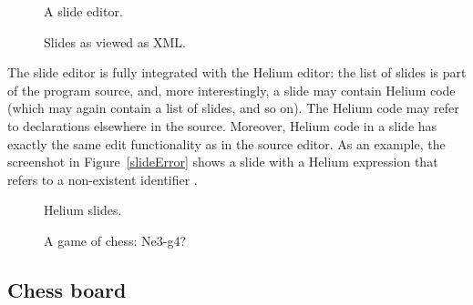 \begin{figure}
  \begin{minipage}[t]{.40\textwidth}
    \begin{center}   
      \caption{A slide editor.} \label{slideEditorWYSIWYG}
    \end{center}
  \end{minipage}
\hfill
  \begin{minipage}[t]{.57\textwidth}
    \begin{center}  
      \caption{Slides as viewed as XML.} \label{slideEditorSource}
    \end{center}
  \end{minipage}
\end{figure}


The slide editor is fully integrated with the Helium editor: the list of slides is part of the program source, and, more interestingly, a slide may contain Helium code (which may again contain a list of slides, and so on). The Helium code may refer to declarations elsewhere in the source. Moreover, Helium code in a slide has exactly the same edit functionality as in the source editor. As an example, the screenshot in Figure~\ref{slideError} shows a slide with  a Helium expression that refers to a non-existent identifier .

\begin{figure}
\begin{minipage}[t]{.47\textwidth}
    \begin{center}   
      \caption{Helium slides.} \label{slideError}
    \end{center}
  \end{minipage}
\hfill
\begin{minipage}[t]{.47\textwidth}
    \begin{center}  
      \caption{A game of chess: Ne3-g4?}\label{chessBoard} 
    \end{center}
  \end{minipage}
\end{figure}



\subsection{Chess board}

